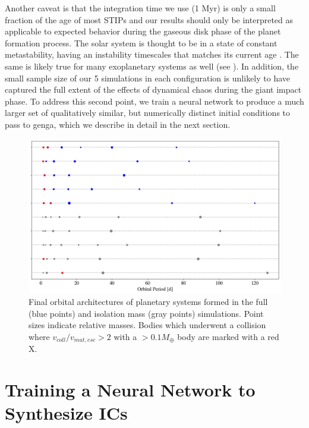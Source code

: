 Another caveat is that the integration time we use (1 Myr) is only a small fraction of the age of most STIPs \cite{silvaaguirre15} and our results should only be interpreted as applicable to expected behavior during the gaseous disk phase of the planet formation process. The solar system is thought to be in a state of constant metastability, having an instability timescales that matches its current age \cite{laskar96}. The same is likely true for many exoplanetary systems as well (see \cite{deck12, lissauer12, lissauer13}). In addition, the small sample size of our 5 simulations in each configuration is unlikely to have captured the full extent of the effects of dynamical chaos during the giant impact phase. To address this second point, we train a neural network to produce a much larger set of qualitatively similar, but numerically distinct initial conditions to pass to {\sc genga}, which we describe in detail in the next section.

\begin{figure}
\begin{center}
    \includegraphics[width=\textwidth]{figures/stip/architectures_iso_comp.png}
    \caption{Final orbital architectures of planetary systems formed in the full (blue points) and isolation mass (gray points) simulations. Point sizes indicate relative masses. Bodies which underwent a collision where $v_{coll}/v_{mut,esc} > 2$ with a $> 0.1 M_{\oplus}$ body are marked with a red X.\label{fig:architectures_iso_comp}}
\end{center}
\end{figure}


\section{Training a Neural Network to Synthesize ICs} \label{sec:neuralICs}

